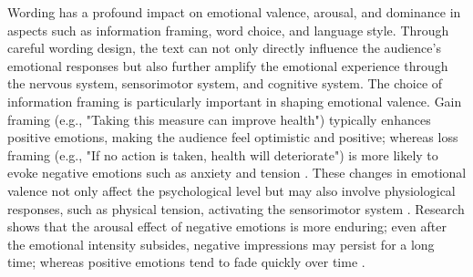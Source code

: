 Wording has a profound impact on emotional valence, arousal, and dominance in aspects such as information framing, word choice, and language style. Through careful wording design, the text can not only directly influence the audience's emotional responses but also further amplify the emotional experience through the nervous system, sensorimotor system, and cognitive system.
The choice of information framing is particularly important in shaping emotional valence. Gain framing (e.g., "Taking this measure can improve health") typically enhances positive emotions, making the audience feel optimistic and positive; whereas loss framing (e.g., "If no action is taken, health will deteriorate") is more likely to evoke negative emotions such as anxiety and tension \cite{seo2019process}. These changes in emotional valence not only affect the psychological level but may also involve physiological responses, such as physical tension, activating the sensorimotor system \cite{panksepp2012archeology}. Research shows that the arousal effect of negative emotions is more enduring; even after the emotional intensity subsides, negative impressions may persist for a long time; whereas positive emotions tend to fade quickly over time \cite{ludwig2013more}.

